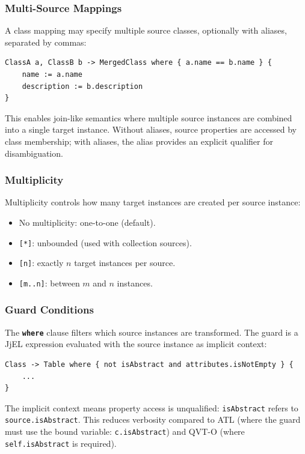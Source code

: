 \documentclass[11pt,a4paper]{article}
\newcommand{\jjel}{\textsf{JjEL}}
\newcommand{\kw}[1]{\texttt{\textbf{#1}}}
\begin{document}
\subsubsection{Multi-Source Mappings}

A class mapping may specify multiple source classes, optionally with aliases, separated by commas:

\begin{lstlisting}[style=jjtl,numbers=none]
ClassA a, ClassB b -> MergedClass where { a.name == b.name } {
    name := a.name
    description := b.description
}
\end{lstlisting}

This enables join-like semantics where multiple source instances are combined into a single target instance. Without aliases, source properties are accessed by class membership; with aliases, the alias provides an explicit qualifier for disambiguation.

\subsubsection{Multiplicity}

Multiplicity controls how many target instances are created per source instance:
\begin{itemize}
    \item No multiplicity: one-to-one (default).
    \item \texttt{[*]}: unbounded (used with collection sources).
    \item \texttt{[n]}: exactly $n$ target instances per source.
    \item \texttt{[m..n]}: between $m$ and $n$ instances.
\end{itemize}

\subsubsection{Guard Conditions}

The \kw{where} clause filters which source instances are transformed. The guard is a \jjel{} expression evaluated with the source instance as implicit context:

\begin{lstlisting}[style=jjtl,numbers=none]
Class -> Table where { not isAbstract and attributes.isNotEmpty } {
    ...
}
\end{lstlisting}

The implicit context means property access is unqualified: \texttt{isAbstract} refers to \texttt{source.isAbstract}. This reduces verbosity compared to ATL (where the guard must use the bound variable: \texttt{c.isAbstract}) and QVT-O (where \texttt{self.isAbstract} is required).
\end{document}
